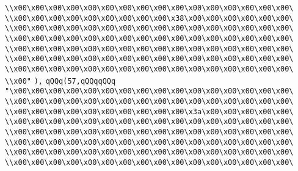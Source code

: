 \verb|\\x00\x00\x00\x00\x00\x00\x00\x00\x00\x00\x00\x00\x00\x00\x00\x00\|\newline
\verb|\\x00\x00\x00\x00\x00\x00\x00\x00\x00\x38\x00\x00\x00\x00\x00\x00\|\newline
\verb|\\x00\x00\x00\x00\x00\x00\x00\x00\x00\x00\x00\x00\x00\x00\x00\x00\|\newline
\verb|\\x00\x00\x00\x00\x00\x00\x00\x00\x00\x00\x00\x00\x00\x00\x00\x00\|\newline
\verb|\\x00\x00\x00\x00\x00\x00\x00\x00\x00\x00\x00\x00\x00\x00\x00\x00\|\newline
\verb|\\x00\x00\x00\x00\x00\x00\x00\x00\x00\x00\x00\x00\x00\x00\x00\x00\|\newline
\verb|\\x00\x00\x00\x00\x00\x00\x00\x00\x00\x00\x00\x00\x00\x00\x00\x00\|\newline
\verb|\\x00"|\newline
\verb|),|\newline
\verb|qQQq(57,qQQqqQQq|\newline
\verb|"\x00\x00\x00\x00\x00\x00\x00\x00\x00\x00\x00\x00\x00\x00\x00\x00\|\newline
\verb|\\x00\x00\x00\x00\x00\x00\x00\x00\x00\x00\x00\x00\x00\x00\x00\x00\|\newline
\verb|\\x00\x00\x00\x00\x00\x00\x00\x00\x00\x00\x3a\x00\x00\x00\x00\x00\|\newline
\verb|\\x00\x00\x00\x00\x00\x00\x00\x00\x00\x00\x00\x00\x00\x00\x00\x00\|\newline
\verb|\\x00\x00\x00\x00\x00\x00\x00\x00\x00\x00\x00\x00\x00\x00\x00\x00\|\newline
\verb|\\x00\x00\x00\x00\x00\x00\x00\x00\x00\x00\x00\x00\x00\x00\x00\x00\|\newline
\verb|\\x00\x00\x00\x00\x00\x00\x00\x00\x00\x00\x00\x00\x00\x00\x00\x00\|\newline
\verb|\\x00\x00\x00\x00\x00\x00\x00\x00\x00\x00\x00\x00\x00\x00\x00\x00\|\newline
